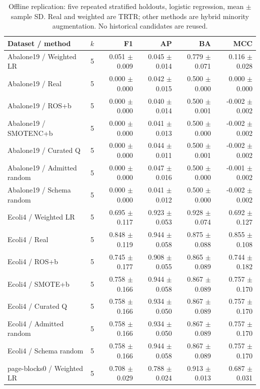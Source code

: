 \begin{table}[!t]
\centering
\caption{Offline replication: five repeated stratified holdouts, logistic regression, mean $\pm$ sample SD. Real and weighted are TRTR; other methods are hybrid minority augmentation. No historical candidates are reused.}\label{tab:repeated}
\footnotesize\setlength{\tabcolsep}{5pt}
\begin{tabular}{lrrrrr}
\toprule
Dataset / method & $k$ & F1 & AP & BA & MCC \\
\midrule
Abalone19 / Weighted LR & 5 & 0.051 $\pm$ 0.009 & 0.045 $\pm$ 0.014 & 0.779 $\pm$ 0.071 & 0.116 $\pm$ 0.028 \\
Abalone19 / Real & 5 & 0.000 $\pm$ 0.000 & 0.042 $\pm$ 0.015 & 0.500 $\pm$ 0.000 & 0.000 $\pm$ 0.000 \\
Abalone19 / ROS+b & 5 & 0.000 $\pm$ 0.000 & 0.040 $\pm$ 0.014 & 0.500 $\pm$ 0.001 & -0.002 $\pm$ 0.002 \\
Abalone19 / SMOTENC+b & 5 & 0.000 $\pm$ 0.000 & 0.041 $\pm$ 0.013 & 0.500 $\pm$ 0.000 & -0.002 $\pm$ 0.002 \\
Abalone19 / Curated Q & 5 & 0.000 $\pm$ 0.000 & 0.044 $\pm$ 0.011 & 0.500 $\pm$ 0.001 & -0.002 $\pm$ 0.002 \\
Abalone19 / Admitted random & 5 & 0.000 $\pm$ 0.000 & 0.047 $\pm$ 0.016 & 0.500 $\pm$ 0.000 & -0.001 $\pm$ 0.002 \\
Abalone19 / Schema random & 5 & 0.000 $\pm$ 0.000 & 0.041 $\pm$ 0.012 & 0.500 $\pm$ 0.000 & -0.002 $\pm$ 0.002 \\
Ecoli4 / Weighted LR & 5 & 0.695 $\pm$ 0.117 & 0.923 $\pm$ 0.053 & 0.928 $\pm$ 0.074 & 0.692 $\pm$ 0.127 \\
Ecoli4 / Real & 5 & 0.848 $\pm$ 0.119 & 0.944 $\pm$ 0.058 & 0.875 $\pm$ 0.088 & 0.855 $\pm$ 0.108 \\
Ecoli4 / ROS+b & 5 & 0.745 $\pm$ 0.177 & 0.908 $\pm$ 0.055 & 0.865 $\pm$ 0.089 & 0.744 $\pm$ 0.182 \\
Ecoli4 / SMOTE+b & 5 & 0.758 $\pm$ 0.166 & 0.944 $\pm$ 0.058 & 0.867 $\pm$ 0.089 & 0.757 $\pm$ 0.170 \\
Ecoli4 / Curated Q & 5 & 0.758 $\pm$ 0.166 & 0.934 $\pm$ 0.050 & 0.867 $\pm$ 0.089 & 0.757 $\pm$ 0.170 \\
Ecoli4 / Admitted random & 5 & 0.758 $\pm$ 0.166 & 0.934 $\pm$ 0.050 & 0.867 $\pm$ 0.089 & 0.757 $\pm$ 0.170 \\
Ecoli4 / Schema random & 5 & 0.758 $\pm$ 0.166 & 0.944 $\pm$ 0.058 & 0.867 $\pm$ 0.089 & 0.757 $\pm$ 0.170 \\
page-blocks0 / Weighted LR & 5 & 0.708 $\pm$ 0.029 & 0.788 $\pm$ 0.024 & 0.913 $\pm$ 0.013 & 0.687 $\pm$ 0.031 \\

\end{tabular}
\end{table}
